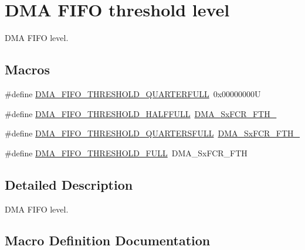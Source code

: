 \hypertarget{group___d_m_a___f_i_f_o__threshold__level}{}\section{D\+MA F\+I\+FO threshold level}
\label{group___d_m_a___f_i_f_o__threshold__level}


D\+MA F\+I\+FO level.  


\subsection*{Macros}
\begin{DoxyCompactItemize}
\item 
\#define \mbox{\hyperlink{group___d_m_a___f_i_f_o__threshold__level_ga4debbd5733190b61b2115613d4b3658b}{D\+M\+A\+\_\+\+F\+I\+F\+O\+\_\+\+T\+H\+R\+E\+S\+H\+O\+L\+D\+\_\+Q\+U\+A\+R\+T\+E\+R\+F\+U\+LL}}~0x00000000U
\item 
\#define \mbox{\hyperlink{group___d_m_a___f_i_f_o__threshold__level_gad2b071aa3a3bfc936017f12fb956c56f}{D\+M\+A\+\_\+\+F\+I\+F\+O\+\_\+\+T\+H\+R\+E\+S\+H\+O\+L\+D\+\_\+\+H\+A\+L\+F\+F\+U\+LL}}~\mbox{\hyperlink{group___peripheral___registers___bits___definition_ga63716e11d34bca95927671055aa63fe8}{D\+M\+A\+\_\+\+Sx\+F\+C\+R\+\_\+\+F\+T\+H\+\_}}
\item 
\#define \mbox{\hyperlink{group___d_m_a___f_i_f_o__threshold__level_gae1e4ba12bae8440421e6672795d71223}{D\+M\+A\+\_\+\+F\+I\+F\+O\+\_\+\+T\+H\+R\+E\+S\+H\+O\+L\+D\+\_\+Q\+U\+A\+R\+T\+E\+R\+S\+F\+U\+LL}}~\mbox{\hyperlink{group___peripheral___registers___bits___definition_gae3d780fc1222a183071c73e62a0524a1}{D\+M\+A\+\_\+\+Sx\+F\+C\+R\+\_\+\+F\+T\+H\+\_}}
\item 
\#define \mbox{\hyperlink{group___d_m_a___f_i_f_o__threshold__level_ga5de463bb24dc12fe7bbb300e1e4493f7}{D\+M\+A\+\_\+\+F\+I\+F\+O\+\_\+\+T\+H\+R\+E\+S\+H\+O\+L\+D\+\_\+\+F\+U\+LL}}~D\+M\+A\+\_\+\+Sx\+F\+C\+R\+\_\+\+F\+TH
\end{DoxyCompactItemize}


\subsection{Detailed Description}
D\+MA F\+I\+FO level. 



\subsection{Macro Definition Documentation}
\mbox{\label{group___d_m_a___f_i_f_o__threshold__level_ga4debbd5733190b61b2115613d4b3658b}} 

